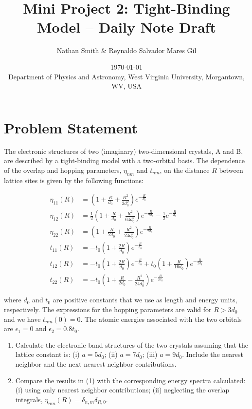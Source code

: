 \documentclass[11pt]{article}
\title{Mini Project 2: Tight-Binding Model -- Daily Note Draft}
\author{Nathan Smith \& Reynaldo Salvador Mares Gil}
\date{\today\\[4pt]
\small Department of Physics and Astronomy, West Virginia University, Morgantown, WV, USA}
\begin{document}
\maketitle

\section*{Problem Statement}

The electronic structures of two (imaginary) two-dimensional crystals, A and B, are described by a tight-binding model with a two-orbital basis. The dependence of the overlap and hopping parameters, $\eta_{nm}$ and $t_{nm}$, on the distance $R$ between lattice sites is given by the following functions:

\begin{align*}
\eta_{11}(R) &= \left(1 + \frac{R}{d_0} + \frac{R^2}{3d_0^2}\right) e^{-\frac{R}{d_0}} \\[6pt]
\eta_{12}(R) &= \frac{1}{2}\left(1 + \frac{R}{d_0} + \frac{R^2}{64d_0^2}\right) e^{-\frac{R}{2d_0}} - \frac{1}{2}e^{-\frac{R}{d_0}} \\[6pt]
\eta_{22}(R) &= \left(1 + \frac{R}{2d_0} + \frac{R^2}{24d_0^2}\right) e^{-\frac{R}{2d_0}} \\[6pt]
t_{11}(R) &= -t_0 \left(1 + \frac{2R}{d_0}\right) e^{-\frac{R}{d_0}} \\[6pt]
t_{12}(R) &= -t_0 \left(1 + \frac{2R}{d_0}\right) e^{-\frac{R}{d_0}} + t_0 \left(1 + \frac{R}{16d_0}\right) e^{-\frac{R}{2d_0}} \\[6pt]
t_{22}(R) &= -t_0 \left(1 + \frac{R}{2d_0} - \frac{R^2}{24d_0^2}\right) e^{-\frac{R}{2d_0}}
\end{align*}

where $d_0$ and $t_0$ are positive constants that we use as length and energy units, respectively. The expressions for the hopping parameters are valid for $R > 3d_0$ and we have $t_{nm}(0) = 0$. The atomic energies associated with the two orbitals are $\epsilon_1 = 0$ and $\epsilon_2 = 0.8t_0$.

\begin{enumerate}
    \item Calculate the electronic band structures of the two crystals assuming that the lattice constant is: (i) $a = 5d_0$; (ii) $a = 7d_0$; (iii) $a = 9d_0$. Include the nearest neighbor and the next nearest neighbor contributions.
    \item Compare the results in (1) with the corresponding energy spectra calculated: (i) using only nearest neighbor contributions; (ii) neglecting the overlap integrals, $\eta_{nm}(R) = \delta_{n,m}\delta_{R,0}$.
\end{enumerate}
\end{document}
